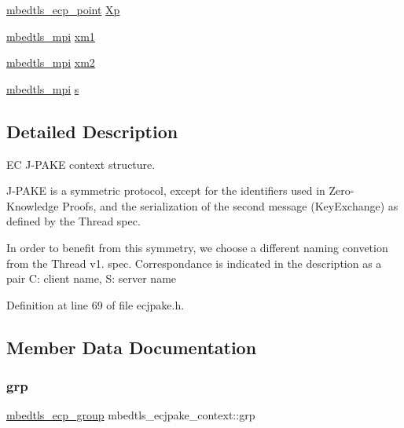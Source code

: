 \begin{DoxyCompactItemize}
\mbox{\hyperlink{structmbedtls__ecp__point}{mbedtls\+\_\+ecp\+\_\+point}} \mbox{\hyperlink{structmbedtls__ecjpake__context_a8f830784980935408a08b5a7e37f7a88}{Xp}}
\item 
\mbox{\hyperlink{structmbedtls__mpi}{mbedtls\+\_\+mpi}} \mbox{\hyperlink{structmbedtls__ecjpake__context_adb90dac8428128ad65d595fc9904fdd3}{xm1}}
\item 
\mbox{\hyperlink{structmbedtls__mpi}{mbedtls\+\_\+mpi}} \mbox{\hyperlink{structmbedtls__ecjpake__context_ae1769cd75e437d673b4a49fc0d01bafc}{xm2}}
\item 
\mbox{\hyperlink{structmbedtls__mpi}{mbedtls\+\_\+mpi}} \mbox{\hyperlink{structmbedtls__ecjpake__context_a532bce70f1a6652df129e28e7193357a}{s}}
\end{DoxyCompactItemize}


\subsection{Detailed Description}
EC J-\/\+P\+A\+KE context structure.

J-\/\+P\+A\+KE is a symmetric protocol, except for the identifiers used in Zero-\/\+Knowledge Proofs, and the serialization of the second message (Key\+Exchange) as defined by the Thread spec.

In order to benefit from this symmetry, we choose a different naming convetion from the Thread v1. spec. Correspondance is indicated in the description as a pair C\+: client name, S\+: server name 

Definition at line 69 of file ecjpake.\+h.



\subsection{Member Data Documentation}
\mbox{\label{structmbedtls__ecjpake__context_ac2604256267f50b4bd75f17655c6299a}} 
\subsubsection{\texorpdfstring{grp}{grp}}
{\footnotesize\ttfamily \mbox{\hyperlink{structmbedtls__ecp__group}{mbedtls\+\_\+ecp\+\_\+group}} mbedtls\+\_\+ecjpake\+\_\+context\+::grp}


